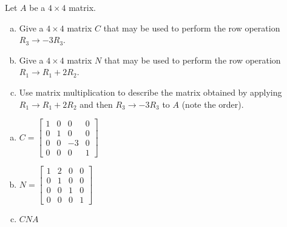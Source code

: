 
\begin{exerciseStatement}


Let \(A\) be a \(4 \times 4\) matrix.


\begin{enumerate}[(a)]
\item Give a \(4 \times 4\) matrix \(C\) that may be used to perform the row operation \( R_3 \to -3R_3 \).
\item Give a \(4 \times 4\) matrix \(N\) that may be used to perform the row operation \( R_1 \to R_1 + 2R_2 \).
\item Use matrix multiplication to describe the matrix obtained by applying \( R_1 \to R_1 + 2R_2 \) and then \( R_3 \to -3R_3 \) to \(A\) (note the order). 
\end{enumerate}
    
\end{exerciseStatement}
    
\begin{exerciseAnswer} 

\begin{enumerate}[(a)]
\item \(C= \left[\begin{array}{cccc}
1 & 0 & 0 & 0 \\
0 & 1 & 0 & 0 \\
0 & 0 & -3 & 0 \\
0 & 0 & 0 & 1
\end{array}\right] \)
\item \(N= \left[\begin{array}{cccc}
1 & 2 & 0 & 0 \\
0 & 1 & 0 & 0 \\
0 & 0 & 1 & 0 \\
0 & 0 & 0 & 1
\end{array}\right] \)
\item \(CNA\)
\end{enumerate}
    
\end{exerciseAnswer}
    
